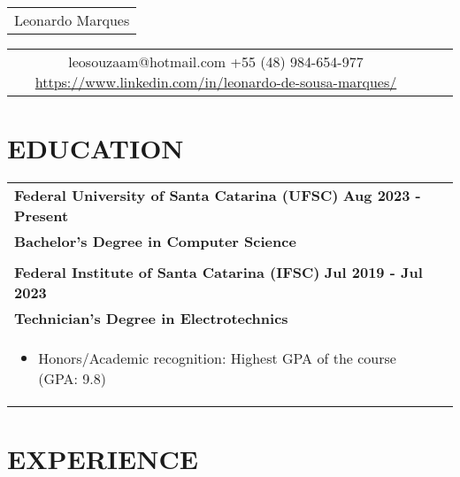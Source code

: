 \documentclass[a4paper,8pt]{article}
\begin{document}
\pagestyle{empty} 

\begin{tabularx}{\linewidth}{@{} C @{}}
\Huge{Leonardo Marques} \\[6pt]
\end{tabularx}

\begin{tabularx}{\linewidth}{@{} C @{} C @{} C}
{{\raisebox{-0.05\height}{\faEnvelope} leosouzaam@hotmail.com}} 
{{\raisebox{-0.05\height}{\faMobile} +55 (48) 984-654-977}} 
{{\href{https://www.linkedin.com/in/nameisjamiele}{\raisebox{-0.05\height}{\faLinkedin} https://www.linkedin.com/in/leonardo-de-sousa-marques/}}}
\end{tabularx}

\section{\textbf{EDUCATION}}
\begin{tabularx}{\linewidth}{ @{}l r@{}}
\textbf{Federal University of Santa Catarina (UFSC)} \hfill \textbf{Aug 2023 - Present} \\[4pt]
\textbf{Bachelor's Degree in Computer Science}\\[0.5pt]
\\ 
\textbf{Federal Institute of Santa Catarina (IFSC)} \hfill \textbf{Jul 2019 - Jul 2023}\\[4pt]
\textbf{Technician's Degree in Electrotechnics}\\[4pt]
\begin{minipage}[t]{\linewidth}
    \begin{itemize}[nosep, after=\strut, leftmargin=1em, itemsep=2pt]
        \item Honors/Academic recognition: Highest GPA of the course (GPA: 9.8)
    \end{itemize}
\end{minipage}
\end{tabularx}

\section{\textbf{EXPERIENCE}}
\end{document}
